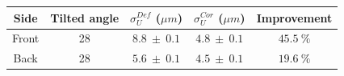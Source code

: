       \begin{table}
        \begin{tabular}{|c|c|c|c|c|}
          \hline %
          Side &  Tilted angle  &   $\sigma_{U}^{Def}$ ($\mu m$) &   $\sigma_{U}^{Cor}$ ($\mu m$) & Improvement \\
          \hline %
          \hline %
          Front &      28       & $ 8.8 \ \pm \ 0.1 $ & $ 4.8 \ \pm \ 0.1 $ &    $45.5 \ \%$  \\
          Back  &      28       & $ 5.6 \ \pm \ 0.1 $ & $ 4.5 \ \pm \ 0.1 $ &    $19.6 \ \%$ \\
          \hline %

\end{tabular}
\end{table}
